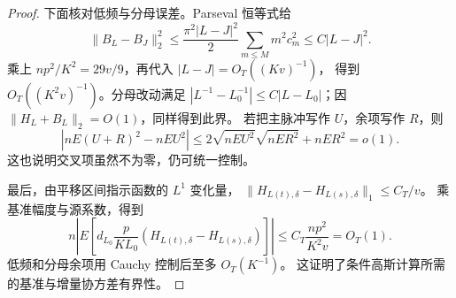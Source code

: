 \documentclass[UTF8,a4paper,11pt,fontset=fandol]{ctexart}
\theoremstyle{remark}
\begin{document}
\begin{proof}
下面核对低频与分母误差。Parseval 恒等式给
\[
 \|B_L-B_J\|_2^2
 \le\frac{\pi^2|L-J|^2}{2}\sum_{m\le M}m^2c_m^2
 \le C|L-J|^2.
\]
乘上 $np^2/K^2=29v/9$，再代入 $|L-J|=O_T((Kv)^{-1})$，
得到 $O_T((K^2v)^{-1})$。分母改动满足
$|L^{-1}-L_0^{-1}|\le C|L-L_0|$；因 $\|H_L+B_L\|_2=O(1)$，同样得到此界。
若把主脉冲写作 $U$，余项写作 $R$，则
\[
 |nE(U+R)^2-nEU^2|
 \le2\sqrt{nEU^2}\sqrt{nER^2}+nER^2=o(1).
\]
这也说明交叉项虽然不为零，仍可统一控制。

最后，由平移区间指示函数的 $L^1$ 变化量，
$\|H_{L(t),\delta}-H_{L(s),\delta}\|_1\le C_T/v$。
乘基准幅度与源系数，得到
\[
 n\left|E\left[d_{L_0}\frac p{KL_0}
       (H_{L(t),\delta}-H_{L(s),\delta})\right]\right|
 \le C_T\frac{np^2}{K^2v}=O_T(1).
\]
低频和分母余项用 Cauchy 控制后至多 $O_T(K^{-1})$。
这证明了条件高斯计算所需的基准与增量协方差有界性。

\end{proof}
\end{document}

